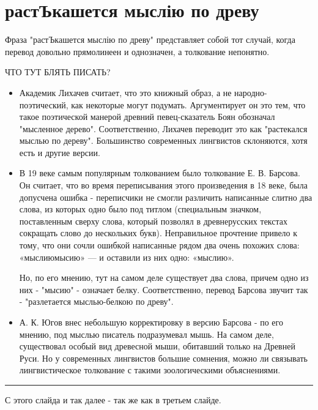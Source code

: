 \documentclass[14pt, a4paper]{article}
\newcommand{\descr}[1]
  {\par\noindent\rule{0.5\textwidth}{0.4pt} \par {\large #1}}
\begin{document}
{\section{растЪкашется мыслію по древу}
\par Фраза "растЪкашется мыслію по древу" представляет собой тот случай, когда перевод довольно прямолинеен и однозначен, а толкование непонятно.
\par ЧТО ТУТ БЛЯТЬ ПИСАТЬ?
\begin{itemize}
  \item Академик Лихачев считает, что это книжный образ, а не народно-поэтический, как некоторые могут подумать. Аргументирует он это тем, что такое поэтической манерой древний певец-сказатель Боян обозначал "мысленное дерево". Соответственно, Лихачев переводит это как "растекался мыслью по дереву". Большинство современных лингвистов склоняются, хотя есть и другие версии.
  \item В 19 веке самым популярным толкованием было толкование Е. В. Барсова. Он считает, что во время переписывания этого произведения в 18 веке, была допусчена ошибка - переписчики не смогли различить написанные слитно два слова, из которых одно было под титлом (специальным значком, поставленным сверху слова, который позво­лял в древнерусских текстах сокращать слово до нескольких букв). Неправильное прочтение привело к тому, что они сочли ошибкой написанные рядом два очень похожих слова: «мыслиюмысию» — и оставили из них одно: «мыслию».
  \par Но, по его мнению, тут на самом деле существует два слова, причем одно из них - "мысию" - означает белку. Соответственно, перевод Барсова звучит так - "разлетается мыслью-белкою по древу".
  \item А. К. Югов внес небольшую корректировку в версию Барсова - по его мнению, под мыслью писатель подразумевал мышь. На самом деле, существовал особый вид древесной мыши, обитавший только на Древней Руси. Но у современных лингвистов большие сомнения, можно ли связывать лингвистическое толкование с такими зоологическими объяснениями.
\end{itemize}
\descr{
С этого слайда и так далее - так же как в третьем слайде.}

}
\end{document}
